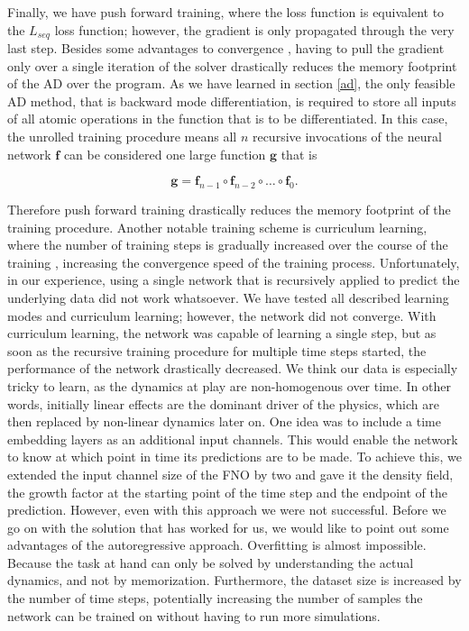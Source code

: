 \documentclass{article}
\begin{document}
Finally, we have push forward training, where the loss function is equivalent to the $L_{seq}$ loss function; however, the gradient is only propagated through the very last step. Besides some advantages to convergence \citep{brandstetter2022message}, having to pull the gradient only over a single iteration of the solver drastically reduces the memory footprint of the AD over the program. As we have learned in section \ref{ad}, the only feasible AD method, that is backward mode differentiation, is required to store all inputs of all atomic operations in the function that is to be differentiated. In this case, the unrolled training procedure means all $n$ recursive invocations of the neural network $\mathbf{f}$ can be considered one large function $\mathbf{g}$ that is 

\begin{equation}
    \mathbf{g} = \mathbf{f}_{n-1} \circ \mathbf{f}_{n-2} \circ \dots \circ \mathbf{f}_0.
\end{equation}

Therefore push forward training drastically reduces the memory footprint of the training procedure. Another notable training scheme is curriculum learning, where the number of training steps is gradually increased over the course of the training \citep{krishnapriyan2021characterizing}, increasing the convergence speed of the training process. Unfortunately, in our experience, using a single network that is recursively applied to predict the underlying data did not work whatsoever. We have tested all described learning modes and curriculum learning; however, the network did not converge. With curriculum learning, the network was capable of learning a single step, but as soon as the recursive training procedure for multiple time steps started, the performance of the network drastically decreased. We think our data is especially tricky to learn, as the dynamics at play are non-homogenous over time. In other words, initially linear effects are the dominant driver of the physics, which are then replaced by non-linear dynamics later on. One idea was to include a time embedding layers as an additional input channels. This would enable the network to know at which point in time its predictions are to be made. To achieve this, we extended the input channel size of the FNO by two and gave it the density field, the growth factor at the starting point of the time step and the endpoint of the prediction. However, even with this approach we were not successful. Before we go on with the solution that has worked for us, we would like to point out some advantages of the autoregressive approach. Overfitting is almost impossible. Because the task at hand can only be solved by understanding the actual dynamics, and not by memorization. Furthermore, the dataset size is increased by the number of time steps, potentially increasing the number of samples the network can be trained on without having to run more simulations. 
\end{document}
